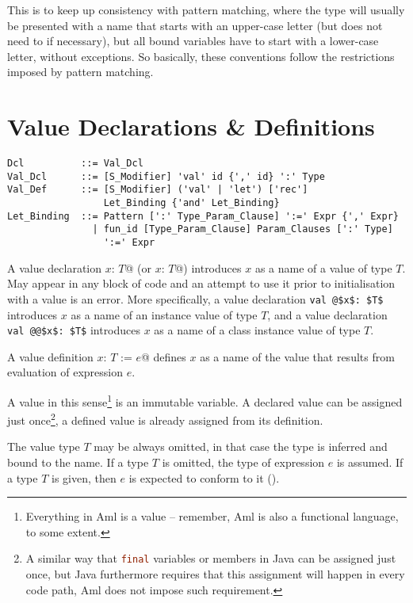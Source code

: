 This is to keep up consistency with pattern matching, where the type will usually be presented with a name that starts with an upper-case letter (but does not need to if necessary), but all bound variables have to start with a lower-case letter, without exceptions. So basically, these conventions follow the restrictions imposed by pattern matching. 





\section{Value Declarations \& Definitions}
\label{sec:value-dcl-def}

\syntax\begin{lstlisting}
Dcl          ::= Val_Dcl
Val_Dcl      ::= [S_Modifier] 'val' id {',' id} ':' Type
Val_Def      ::= [S_Modifier] ('val' | 'let') ['rec']
                 Let_Binding {'and' Let_Binding}
Let_Binding  ::= Pattern [':' Type_Param_Clause] ':=' Expr {',' Expr}
               | fun_id [Type_Param_Clause] Param_Clauses [':' Type]
                 ':=' Expr
\end{lstlisting}

A value declaration \lstinline@val $x$: $T$@ (or \lstinline@let $x$: $T$@) introduces $x$ as a name of a value of type $T$. May appear in any block of code and an attempt to use it prior to initialisation with a value is an error. More specifically, a value declaration \lstinline+val @$x$: $T$+ introduces $x$ as a name of an instance value of type $T$, and a value declaration \lstinline+val @@$x$: $T$+ introduces $x$ as a name of a class instance value of type $T$. 

A value definition \lstinline@val $x$: $T$ := $e$@ defines $x$ as a name of the value that results from evaluation of expression $e$.

A value in this sense\footnote{Everything in Aml is a value -- remember, Aml is also a functional language, to some extent.} is an immutable variable. A declared value can be assigned just once\footnote{A similar way that \lstinline[language=Java]@final@ variables or members in Java can be assigned just once, but Java furthermore requires that this assignment will happen in every code path, Aml does not impose such requirement.}, a defined value is already assigned from its definition. 

The value type $T$ may be always omitted, in that case the type is inferred and bound to the name. If a type $T$ is omitted, the type of expression $e$ is assumed. If a type $T$ is given, then $e$ is expected to conform to it (). 

